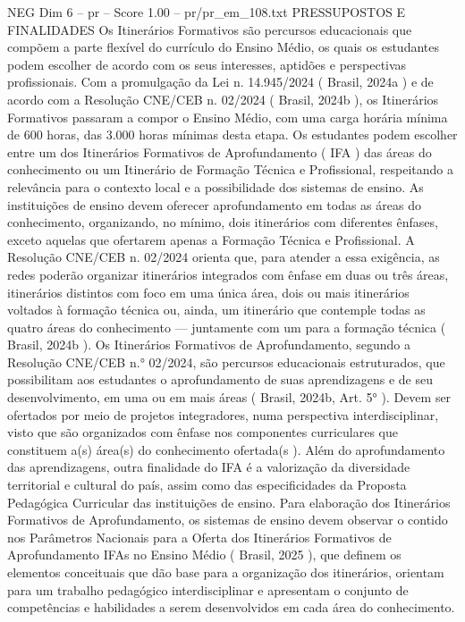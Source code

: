 \begin{textsample}{NEG Dim 6 – pr – Score 1.00 – pr/pr\_em\_108.txt}  \label{ex:f6_neg_266}
PRESSUPOSTOS E FINALIDADES Os Itinerários Formativos são percursos educacionais que compõem a parte flexível do currículo do Ensino Médio, os quais os estudantes podem escolher de acordo com os seus interesses, aptidões e perspectivas profissionais.
Com a promulgação da Lei n. 14.945/2024 ( Brasil, 2024a ) e de acordo com a Resolução CNE/CEB n. 02/2024 ( Brasil, 2024b ), os Itinerários Formativos passaram a compor o Ensino Médio, com uma carga horária mínima de 600 horas, das 3.000 horas mínimas desta etapa.
Os estudantes podem escolher entre um dos Itinerários Formativos de Aprofundamento ( IFA ) das áreas do conhecimento ou um Itinerário de Formação Técnica e Profissional, respeitando a relevância para o contexto local e a possibilidade dos sistemas de ensino.
As instituições de ensino devem oferecer aprofundamento em todas as áreas do conhecimento, organizando, no mínimo, dois itinerários com diferentes ênfases, exceto aquelas que ofertarem apenas a Formação Técnica e Profissional.
A Resolução CNE/CEB n. 02/2024 orienta que, para atender a essa exigência, as redes poderão organizar itinerários integrados com ênfase em duas ou três áreas, itinerários distintos com foco em uma única área, dois ou mais itinerários voltados à formação técnica ou, ainda, um itinerário que contemple todas as quatro áreas do conhecimento — juntamente com um para a formação técnica ( Brasil, 2024b ).
Os Itinerários Formativos de Aprofundamento, segundo a Resolução CNE/CEB n.{\EmojiFont °} 02/2024, são percursos educacionais estruturados, que possibilitam aos estudantes o aprofundamento de suas aprendizagens e de seu desenvolvimento, em uma ou em mais áreas ( Brasil, 2024b, Art. 5{\EmojiFont °} ).
Devem ser ofertados por meio de projetos integradores, numa perspectiva interdisciplinar, visto que são organizados com ênfase nos componentes curriculares que constituem a(s) área(s) do conhecimento ofertada(s ).
Além do aprofundamento das aprendizagens, outra finalidade do IFA é a valorização da diversidade territorial e cultural do país, assim como das especificidades da Proposta Pedagógica Curricular das instituições de ensino.
Para elaboração dos Itinerários Formativos de Aprofundamento, os sistemas de ensino devem observar o contido nos Parâmetros Nacionais para a Oferta dos Itinerários Formativos de Aprofundamento IFAs no Ensino Médio ( Brasil, 2025 ), que definem os elementos conceituais que dão base para a organização dos itinerários, orientam para um trabalho pedagógico interdisciplinar e apresentam o conjunto de competências e habilidades a serem desenvolvidos em cada área do conhecimento.

\end{textsample}

